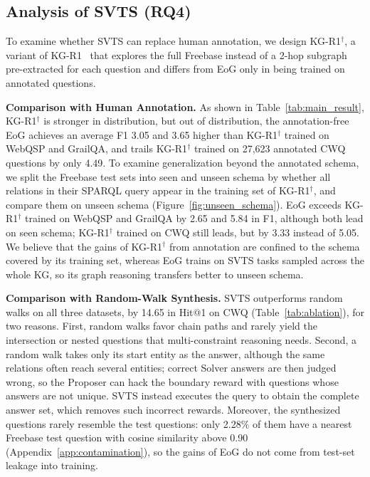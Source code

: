 \subsection{Analysis of SVTS (RQ4)}
\label{sec:rq-svts}
To examine whether SVTS can replace human annotation, we design KG-R1$^\dagger$, a variant of KG-R1~\citep{KG-R1} that explores the full Freebase instead of a 2-hop subgraph pre-extracted for each question and differs from EoG only in being trained on annotated questions.

\textbf{Comparison with Human Annotation.} As shown in Table~\ref{tab:main_result}, KG-R1$^\dagger$ is stronger in distribution, but out of distribution, the annotation-free EoG achieves an average F1 3.05 and 3.65 higher than KG-R1$^\dagger$ trained on WebQSP and GrailQA, and trails KG-R1$^\dagger$ trained on 27,623 annotated CWQ questions by only 4.49. To examine generalization beyond the annotated schema, we split the Freebase test sets into seen and unseen schema by whether all relations in their SPARQL query appear in the training set of KG-R1$^\dagger$, and compare them on unseen schema (Figure~\ref{fig:unseen_schema}). EoG exceeds KG-R1$^\dagger$ trained on WebQSP and GrailQA by 2.65 and 5.84 in F1, although both lead on seen schema; KG-R1$^\dagger$ trained on CWQ still leads, but by 3.33 instead of 5.05. We believe that the gains of KG-R1$^\dagger$ from annotation are confined to the schema covered by its training set, whereas EoG trains on SVTS tasks sampled across the whole KG, so its graph reasoning transfers better to unseen schema.

\textbf{Comparison with Random-Walk Synthesis.} SVTS outperforms random walks on all three datasets, by 14.65 in Hit@1 on CWQ (Table~\ref{tab:ablation}), for two reasons. First, random walks favor chain paths and rarely yield the intersection or nested questions that multi-constraint reasoning needs. Second, a random walk takes only its start entity as the answer, although the same relations often reach several entities; correct Solver answers are then judged wrong, so the Proposer can hack the boundary reward with questions whose answers are not unique. SVTS instead executes the query to obtain the complete answer set, which removes such incorrect rewards. Moreover, the synthesized questions rarely resemble the test questions: only 2.28\% of them have a nearest Freebase test question with cosine similarity above 0.90 (Appendix~\ref{app:contamination}), so the gains of EoG do not come from test-set leakage into training.

